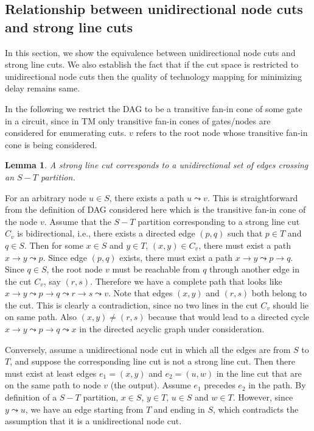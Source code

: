 \documentclass[journal]{IEEEtran}
\newtheorem{lemma}{Lemma}
\begin{document}
\subsection{Relationship between unidirectional node cuts and strong line cuts}
In this section, we show the equivalence between unidirectional node cuts and strong line cuts. We also establish the fact that if the cut space is restricted to unidirectional node cuts then the quality of technology mapping for minimizing delay remains same.

In the following we restrict the DAG to be a transitive fan-in cone of some gate in a circuit, since in TM  only transitive fan-in cones of gates/nodes are considered for enumerating cuts. $v$ refers to the root node whose transitive fan-in cone is being considered. 

\begin{lemma}
\label{lem:unidirmis}
A strong line cut corresponds to a unidirectional set of edges crossing an $S-T$ partition.
\end{lemma}
\begin{IEEEproof}
For an arbitrary node $u \in S$, there exists a path $u \leadsto v$.  This is straightforward from the definition of DAG considered here which is the transitive fan-in cone of the node $v$. 
Assume that the $S-T$ partition corresponding to a strong line cut $C_v$ is bidirectional, i.e., there exists a directed edge $(p,q)$ such that $p \in T$ and $q \in S$. Then for some $x \in S$ and $y \in T$, $(x,y) \in C_v$,  there must exist a path $x \rightarrow y \leadsto p$. 
Since edge $(p,q)$ exists, there must exist a path $x \rightarrow y \leadsto p \rightarrow q$. Since $q \in S$, the root node $v$ must be reachable from $q$ through another edge in the cut $C_v$, say $(r,s)$. Therefore we have a complete path that looks like $x \rightarrow y \leadsto p \rightarrow q \leadsto r \rightarrow s \leadsto v$. Note that edges $(x,y)$ and $(r,s)$ both belong to the cut. This is clearly a contradiction, since no two lines in the cut $C_v$ should lie on same path. Also $(x,y) \neq (r,s)$ because that would lead to a directed cycle $x \rightarrow y \leadsto p \rightarrow q \leadsto x$ in the directed acyclic graph under consideration.

Conversely, assume a unidirectional node cut in which all the edges are from $S$ to $T$, and suppose the corresponding line cut is not a strong line cut.  Then there must exist at least edges $e_1 = (x,y)$ and $e_2 = (u,w)$ in the line cut that are on the same path to node $v$ (the output).  Assume $e_1$ precedes $e_2$ in the path.  By definition of a $S-T$ partition, $x \in S$, $y \in T$, $u \in S$ and $w \in T$.  However, since $y \leadsto u$, we have an edge starting from $T$ and ending in $S$, which contradicts the assumption that it is a unidirectional node cut. 
\end{IEEEproof}
\end{document}
